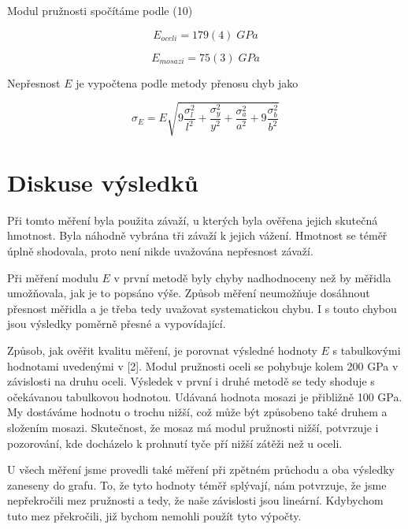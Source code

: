 Modul pružnosti spočítáme podle (10)

\begin{equation}
\nonumber
    E_{oceli} = 179(4) \; GPa
\end{equation}

\begin{equation}
    \nonumber
    E_{mosazi} = 75(3) \; GPa
\end{equation}

Nepřesnost \(E\) je vypočtena podle metody přenosu chyb jako

\begin{equation}
    \sigma_E = E \sqrt{9\frac{\sigma^2_l}{l^2}+\frac{\sigma^2_y}{y^2}+\frac{\sigma^2_a}{a^2}+9\frac{\sigma^2_b}{b^2}}
\end{equation}

\newpage
\;
\newpage
\section{Diskuse výsledků}

Při tomto měření byla použita závaží, u kterých byla ověřena jejich skutečná hmotnost. Byla náhodně vybrána tři závaží k jejich vážení. Hmotnost se téměř úplně shodovala, proto není nikde uvažována nepřesnost závaží.

Při měření modulu \(E\) v první metodě byly chyby nadhodnoceny než by měřidla umožňovala, jak je to popsáno výše. Způsob měření neumožňuje dosáhnout přesnost měřidla a je třeba tedy uvažovat systematickou chybu. I s touto chybou jsou výsledky poměrně přesné a vypovídající.

Způsob, jak ověřit kvalitu měření, je porovnat výsledné hodnoty \(E\) s tabulkovými hodnotami uvedenými v [2]. Modul pružnosti oceli se pohybuje kolem 200 GPa v závislosti na druhu oceli. Výsledek v první i druhé metodě se tedy shoduje s očekávanou tabulkovou hodnotou. Udávaná hodnota mosazi je přibližně 100 GPa. My dostáváme hodnotu o trochu nižší, což může být způsobeno také druhem a složením mosazi. Skutečnost, že mosaz má modul pružnosti nižší, potvrzuje i pozorování, kde docházelo k prohnutí tyče pří nižší zátěži než u oceli.

U všech měření jsme provedli také měření při zpětném průchodu a oba výsledky zaneseny do grafu. To, že tyto hodnoty téměř splývají, nám potvrzuje, že jsme nepřekročili mez pružnosti a tedy, že naše závislosti jsou lineární. Kdybychom tuto mez překročili, již bychom nemohli použít tyto výpočty.

